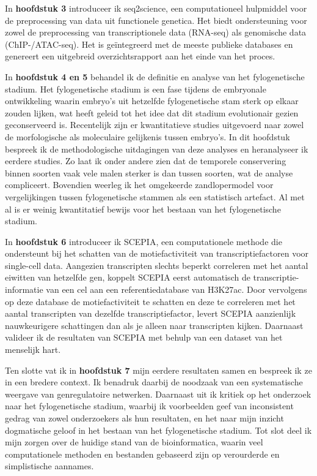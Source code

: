 In \textbf{hoofdstuk 3} introduceer ik seq2science, een computationeel hulpmiddel voor de preprocessing van data uit functionele genetica. Het biedt ondersteuning voor zowel de preprocessing van transcriptionele data (RNA-seq) als genomische data (ChIP-/ATAC-seq). Het is geïntegreerd met de meeste publieke databases en genereert een uitgebreid overzichtsrapport aan het einde van het proces.

In \textbf{hoofdstuk 4 en 5} behandel ik de definitie en analyse van het fylogenetische stadium. Het fylogenetische stadium is een fase tijdens de embryonale ontwikkeling waarin embryo's uit hetzelfde fylogenetische stam sterk op elkaar zouden lijken, wat heeft geleid tot het idee dat dit stadium evolutionair gezien geconserveerd is. Recentelijk zijn er kwantitatieve studies uitgevoerd naar zowel de morfologische als moleculaire gelijkenis tussen embryo's. In dit hoofdstuk bespreek ik de methodologische uitdagingen van deze analyses en heranalyseer ik eerdere studies. Zo laat ik onder andere zien dat de temporele conservering binnen soorten vaak vele malen sterker is dan tussen soorten, wat de analyse compliceert. Bovendien weerleg ik het omgekeerde zandlopermodel voor vergelijkingen tussen fylogenetische stammen als een statistisch artefact. Al met al is er weinig kwantitatief bewijs voor het bestaan van het fylogenetische stadium.

In \textbf{hoofdstuk 6} introduceer ik SCEPIA, een computationele methode die ondersteunt bij het schatten van de motiefactiviteit van transcriptiefactoren voor single-cell data. Aangezien transcripten slechts beperkt correleren met het aantal eiwitten van hetzelfde gen, koppelt SCEPIA eerst automatisch de transcriptie-informatie van een cel aan een referentiedatabase van H3K27ac. Door vervolgens op deze database de motiefactiviteit te schatten en deze te correleren met het aantal transcripten van dezelfde transcriptiefactor, levert SCEPIA aanzienlijk nauwkeurigere schattingen dan als je alleen naar transcripten kijken. Daarnaast valideer ik de resultaten van SCEPIA met behulp van een dataset van het menselijk hart.

Ten slotte vat ik in \textbf{hoofdstuk 7} mijn eerdere resultaten samen en bespreek ik ze in een bredere context. Ik benadruk daarbij de noodzaak van een systematische weergave van genregulatoire netwerken. Daarnaast uit ik kritiek op het onderzoek naar het fylogenetische stadium, waarbij ik voorbeelden geef van inconsistent gedrag van zowel onderzoekers als hun resultaten, en het naar mijn inzicht dogmatische geloof in het bestaan van het fylogenetische stadium. Tot slot deel ik mijn zorgen over de huidige stand van de bioinformatica, waarin veel computationele methoden en bestanden gebaseerd zijn op verourderde en simplistische aannames.

